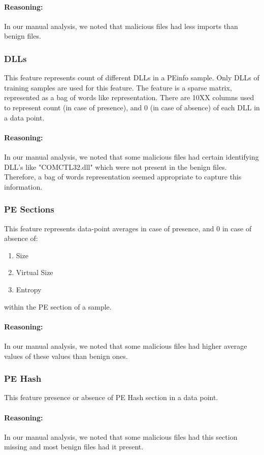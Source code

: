 \documentclass{llncs}
\begin{document}
\paragraph{Reasoning:}
In our manual analysis, we noted that malicious files had less imports than benign files.

\subsubsection{DLLs}
This feature represents count of different DLLs in a PEinfo sample. Only DLLs of training samples are used for this feature. The feature is a sparse matrix, represented as a bag of words like representation. 
There are 10XX columns used to represent count (in case of presence), and 0 (in case of absence) of each DLL in a data point.
\paragraph{Reasoning:}
In our manual analysis, we noted that some malicious files had certain identifying DLL's like "COMCTL32.dll" which were not present in the benign files. Therefore, a bag of words representation seemed appropriate to capture this information.

\subsubsection{PE Sections}
This feature represents data-point averages in case of presence, and 0 in case of absence of:
\begin{enumerate}
	\item Size
	\item Virtual Size
	\item Entropy
\end {enumerate}
within the PE section of a sample.
\paragraph{Reasoning:}
In our manual analysis, we noted that some malicious files had higher average values of these values than benign ones.

\subsubsection{PE Hash}
This feature presence or absence of PE Hash section in a data point.
\paragraph{Reasoning:}
In our manual analysis, we noted that some malicious files had this section missing and most benign files had it present.
\end{document}
